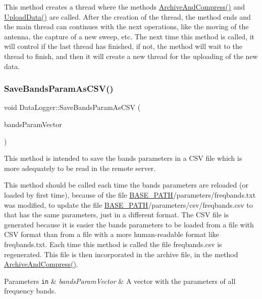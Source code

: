 This method creates a thread where the methods {\ttfamily \hyperlink{classDataLogger_a147fb7eaee1c38bbf57ef2d6cddf70d5}{Archive\+And\+Compress()}} and {\ttfamily \hyperlink{classDataLogger_ab58f4cc05f738ef757c884fe9ef131eb}{Upload\+Data()}} are called. After the creation of the thread, the method ends and the main thread can continues with the next operations, like the moving of the antenna, the capture of a new sweep, etc. The next time this method is called, it will control if the last thread has finished, if not, the method will wait to the thread to finish, and then it will create a new thread for the uploading of the new data. \mbox{\label{classDataLogger_a2ffe9fb45883c2880e1c45a4406fc22b}} 
\subsubsection{\texorpdfstring{Save\+Bands\+Param\+As\+C\+S\+V()}{SaveBandsParamAsCSV()}}
{\footnotesize\ttfamily void Data\+Logger\+::\+Save\+Bands\+Param\+As\+C\+SV (\begin{DoxyParamCaption}\item[{const std\+::vector$<$ \hyperlink{structBandParameters}{Band\+Parameters} $>$ \&}]{bands\+Param\+Vector }\end{DoxyParamCaption})}



This method is intended to save the bands parameters in a C\+SV file which is more adequately to be read in the remote server. 

This method should be called each time the bands\textquotesingle{} parameters are reloaded (or loaded by first time), because of the file \hyperlink{Basics_8h_a0423f4cb393331ce0b9f6b3a43adcaae}{B\+A\+S\+E\+\_\+\+P\+A\+TH}/parameters/freqbands.txt was modified, to update the file \hyperlink{Basics_8h_a0423f4cb393331ce0b9f6b3a43adcaae}{B\+A\+S\+E\+\_\+\+P\+A\+TH}/parameters/csv/freqbands.csv to that has the same parameters, just in a different format. The C\+SV file is generated because it is easier the bands\textquotesingle{} parameters to be loaded from a file with C\+SV format than from a file with a more human-\/readable format like freqbands.\+txt. Each time this method is called the file freqbands.\+csv is regenerated. This file is then incorporated in the archive file, in the method \hyperlink{classDataLogger_a147fb7eaee1c38bbf57ef2d6cddf70d5}{Archive\+And\+Compress()}. 
\begin{DoxyParams}[1]{Parameters}
\mbox{\tt in}  & {\em bands\+Param\+Vector} & A vector with the parameters of all frequency bands. \\
\hline
\end{DoxyParams}
\mbox{\label{classDataLogger_a058ed66d04269e7d37501ecfe775c067}} 
